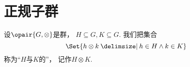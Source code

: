 %
%
%
%

\section{正规子群}
\begin{definition}\label{definition:抽象代数.正规子群.子集乘积的定义}
设\(\opair{G,\otimes}\)是群，
\(H \subseteq G,
K \subseteq G\).
我们把集合\[
	\Set{ h \otimes k \given h \in H \land k \in K }
\]
称为“\(H\)与\(K\)的”，
记作\(H \otimes K\).
\end{definition}

